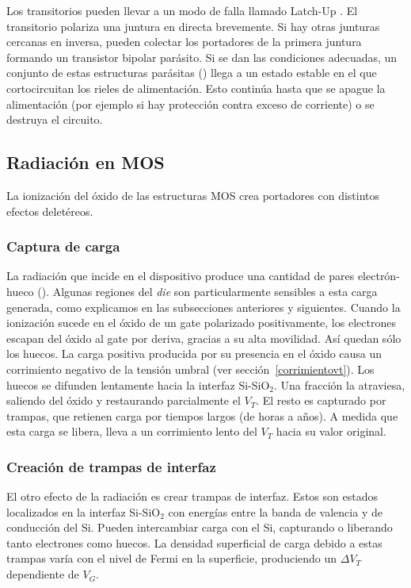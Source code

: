 Los transitorios pueden llevar a un modo de falla llamado Latch-Up
\cite{gregory_latch-up_1973}.
El transitorio polariza una juntura en directa brevemente.
Si hay otras junturas cercanas en inversa,
pueden colectar los portadores de la primera juntura 
formando un transistor bipolar parásito.
Si se dan las condiciones adecuadas,
un conjunto de estas estructuras parásitas ()
llega a un estado estable
en el que cortocircuitan los rieles de alimentación.
Esto continúa hasta que se apague la alimentación 
(por ejemplo si hay protección contra exceso de corriente)
o se destruya el circuito.
\subsection{Radiación en MOS}
La ionización del óxido de las estructuras MOS crea portadores 
con distintos efectos deletéreos. 
\subsubsection{Captura de carga}
La radiación que incide en el dispositivo 
produce una cantidad de pares electrón-hueco ().
Algunas regiones del \emph{die}
son particularmente sensibles a esta carga generada,
como explicamos en las subsecciones anteriores y siguientes.
Cuando la ionización sucede en el óxido de un gate polarizado positivamente,
los electrones escapan del óxido al gate por deriva,
gracias a su alta movilidad.
Así quedan sólo los huecos.
La carga positiva producida por su presencia en el óxido 
causa un corrimiento negativo de la tensión umbral 
(ver sección~\ref{corrimientovt}).
Los huecos se difunden lentamente hacia la interfaz Si-SiO$_2$.
Una fracción la atraviesa, 
saliendo del óxido y restaurando parcialmente el $V_T$.
El resto es capturado por trampas,
que retienen carga por tiempos largos (de horas a años).
A medida que esta carga se libera, 
lleva a un corrimiento lento del $V_T$ hacia su valor original.
\subsubsection{Creación de trampas de interfaz}
El otro efecto de la radiación es crear trampas de interfaz.
Estos son estados localizados en la interfaz Si-SiO$_2$ con
energías entre la banda de valencia y de conducción del Si.
Pueden intercambiar carga con el Si,
capturando o liberando tanto electrones como huecos.
La densidad superficial de carga debido a estas trampas varía con el nivel de
Fermi en la superficie, produciendo un $\Delta V_T$ dependiente de $V_G$.
